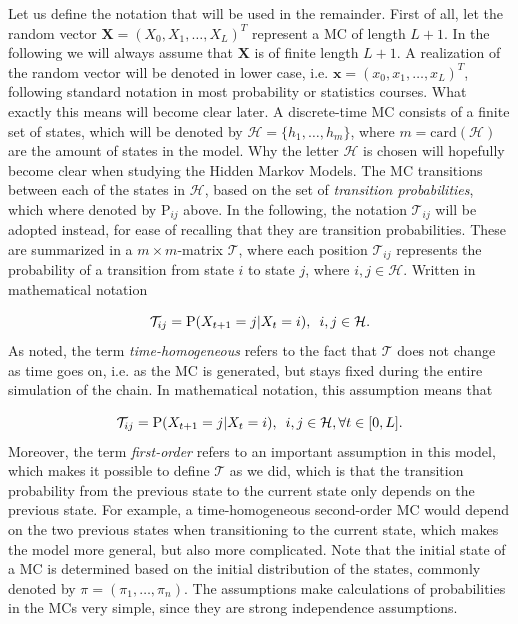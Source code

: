 \documentclass{article}
\begin{document}
Let us define the notation that will be used in the remainder. First of all, let the random vector $\mathbf{X} = (X_0, X_1, \ldots, X_L)^T$ represent a MC of length $L+1$. In the following we will always assume that $\mathbf{X}$ is of finite length $L+1$. A realization of the random vector will be denoted in lower case, i.e. $\mathbf{x} = (x_0, x_1, \ldots, x_L)^T$, following standard notation in most probability or statistics courses. What exactly this means will become clear later. A discrete-time MC consists of a finite set of states, which will be denoted by $\mathcal{H} = \{h_1, \ldots, h_m\}$, where $m = \text{card}(\mathcal{H})$ are the amount of states in the model. Why the letter $\mathcal{H}$ is chosen will hopefully become clear when studying the Hidden Markov Models. The MC transitions between each of the states in $\mathcal{H}$, based on the set of \textit{transition probabilities}, which where denoted by $\text{P}_{ij}$ above. In the following, the notation $\mathcal{T}_{ij}$ will be adopted instead, for ease of recalling that they are transition probabilities. These are summarized in a $m \times m$-matrix $\mathcal{T}$, where each position $\mathcal{T}_{ij}$ represents the probability of a transition from state $i$ to state $j$, where $i, j \in \mathcal{H}$. Written in mathematical notation

\begin{equation*}
        \mathcal{T}_{ij} = \text{P}(X_{t+1} = j|X_{t} = i), \hspace{0.5em} i,j \in \mathcal{H}. 
\end{equation*}
As noted, the term \textit{time-homogeneous} refers to the fact that $\mathcal{T}$ does not change as time goes on, i.e. as the MC is generated, but stays fixed during the entire simulation of the chain. In mathematical notation, this assumption means that

\begin{equation*}
    \mathcal{T}_{ij} = \text{P}(X_{t+1} = j|X_{t} = i), \hspace{0.5em} i,j \in \mathcal{H}, \forall t \in [0,L].
\end{equation*}
Moreover, the term \textit{first-order} refers to an important assumption in this model, which makes it possible to define $\mathcal{T}$ as we did, which is that the transition probability from the previous state to the current state only depends on the previous state. For example, a time-homogeneous second-order MC would depend on the two previous states when transitioning to the current state, which makes the model more general, but also more complicated. Note that the initial state of a MC is determined based on the initial distribution of the states, commonly denoted by $\pi = (\pi_1, \ldots, \pi_n)$. The assumptions make calculations of probabilities in the MCs very simple, since they are strong independence assumptions. 
\end{document}
